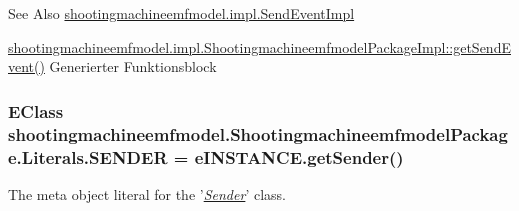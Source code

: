 \begin{DoxySeeAlso}{See Also}
\hyperlink{classshootingmachineemfmodel_1_1impl_1_1_send_event_impl}{shootingmachineemfmodel.\-impl.\-Send\-Event\-Impl} 

\hyperlink{classshootingmachineemfmodel_1_1impl_1_1_shootingmachineemfmodel_package_impl_aa809696addcdd5ce6873eae0d5f4c1e6}{shootingmachineemfmodel.\-impl.\-Shootingmachineemfmodel\-Package\-Impl\-::get\-Send\-Event()} Generierter Funktionsblock 
\end{DoxySeeAlso}
\hypertarget{interfaceshootingmachineemfmodel_1_1_shootingmachineemfmodel_package_1_1_literals_aa357d1c04e9e4b8441204c409714c446}{
\subsubsection[{S\-E\-N\-D\-E\-R}]{\setlength{\rightskip}{0pt plus 5cm}E\-Class shootingmachineemfmodel.\-Shootingmachineemfmodel\-Package.\-Literals.\-S\-E\-N\-D\-E\-R = e\-I\-N\-S\-T\-A\-N\-C\-E.\-get\-Sender()}}\label{interfaceshootingmachineemfmodel_1_1_shootingmachineemfmodel_package_1_1_literals_aa357d1c04e9e4b8441204c409714c446}
The meta object literal for the '\hyperlink{classshootingmachineemfmodel_1_1impl_1_1_sender_impl}{{\itshape Sender}}' class.

